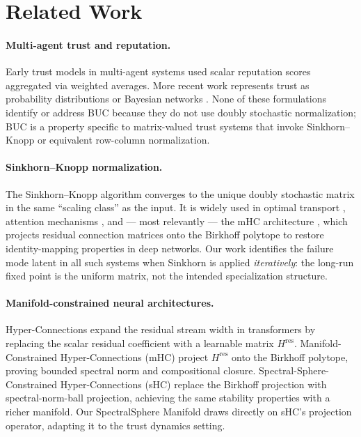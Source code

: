 \section{Related Work}
\label{sec:related}

\paragraph{Multi-agent trust and reputation.}
Early trust models in multi-agent systems \cite{sabater2005review} used scalar reputation
scores aggregated via weighted averages.  More recent work represents trust as probability
distributions \cite{josang2007subjective} or Bayesian networks \cite{teacy2012travos}.
None of these formulations identify or address BUC because they do not use doubly
stochastic normalization; BUC is a property specific to matrix-valued trust systems that
invoke Sinkhorn--Knopp or equivalent row-column normalization.

\paragraph{Sinkhorn--Knopp normalization.}
The Sinkhorn--Knopp algorithm \cite{sinkhorn1964relationship,sinkhorn1967concerning}
converges to the unique doubly stochastic matrix in the same ``scaling class'' as the
input.  It is widely used in optimal transport \cite{cuturi2013sinkhorn}, attention
mechanisms \cite{sinkhorn_transformer}, and — most relevantly — the mHC architecture
\cite{xie2025mhc}, which projects residual connection matrices onto the Birkhoff polytope
to restore identity-mapping properties in deep networks.  Our work identifies the failure
mode latent in all such systems when Sinkhorn is applied \emph{iteratively}: the
long-run fixed point is the uniform matrix, not the intended specialization structure.

\paragraph{Manifold-constrained neural architectures.}
Hyper-Connections \cite{zhu2024hyper} expand the residual stream width in transformers by
replacing the scalar residual coefficient with a learnable matrix $H^{\mathrm{res}}$.
Manifold-Constrained Hyper-Connections (mHC) \cite{xie2025mhc} project $H^{\mathrm{res}}$
onto the Birkhoff polytope, proving bounded spectral norm and compositional closure.
Spectral-Sphere-Constrained Hyper-Connections (sHC) \cite{shc2025spectral} replace the
Birkhoff projection with spectral-norm-ball projection, achieving the same stability
properties with a richer manifold.  Our SpectralSphere Manifold draws directly on sHC's
projection operator, adapting it to the trust dynamics setting.

